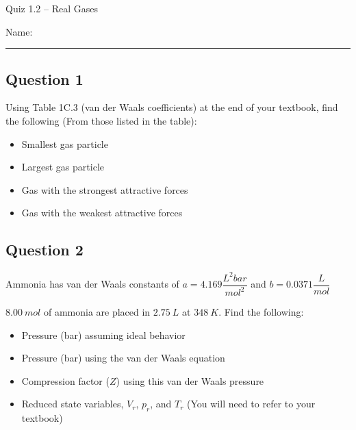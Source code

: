 \documentclass[11pt, letterpaper]{memoir}
\begin{document}
	\begin{center}
		{\large Quiz 1.2 --	Real Gases}
	\end{center}
	{\large Name: \rule[-1mm]{4in}{.1pt} 

\subsection*{Question 1}
Using Table 1C.3 (van der Waals coefficients) at the end of your textbook, find the following (From those listed in the table):
\begin{itemize}
	\item Smallest gas particle
	
	\vspace{1em}
	\item Largest gas particle
	
	\vspace{1em}
	\item Gas with the strongest attractive forces
	
	\vspace{1em}
	\item Gas with the weakest attractive forces
\end{itemize}

\vspace{1em}
\subsection*{Question 2}
Ammonia has van der Waals constants of $a=4.169\dfrac{L^2bar}{mol^2}$ and $b=0.0371\dfrac{L}{mol}$

\noindent $8.00~mol$ of ammonia are placed in $2.75~L$ at $348~K$. Find the following:
\begin{itemize}
	\item Pressure (bar) assuming ideal behavior
	
	\vspace{3em}
	\item Pressure (bar) using the van der Waals equation
	
	\vspace{4em}
	\item Compression factor ($Z$) using this van der Waals pressure
	
	\vspace{4em}
	\item Reduced state variables, $V_r$, $p_r$, and $T_r$ (You will need to refer to your textbook)
\end{itemize}

}
\end{document}
